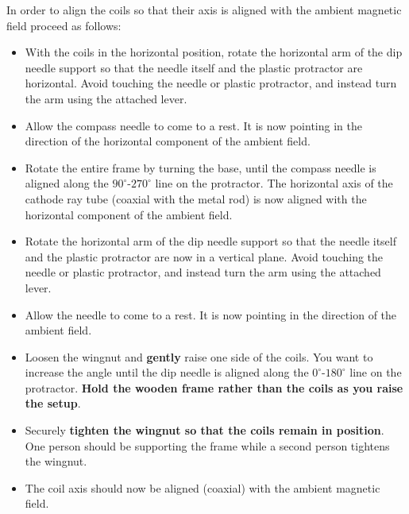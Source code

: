 In order to align the coils so that their axis is aligned with the ambient magnetic field proceed as follows:
\begin{itemize}
    \item With the coils in the horizontal position, rotate the horizontal arm of the dip needle support so that the needle itself and the plastic protractor are horizontal.  Avoid touching the needle or plastic protractor, and instead turn the arm using the attached lever.
    \item Allow the compass needle to come to a rest.  It is now pointing in the direction of the horizontal component of the ambient field.
    \item Rotate the entire frame by turning the base, until the compass needle is aligned along the $90^\circ$-$270^\circ$ line on the protractor.  The horizontal axis of the cathode ray tube (coaxial with the metal rod) is now aligned with the horizontal component of the ambient field.
    \item Rotate the horizontal arm of the dip needle support so that the needle itself and the plastic protractor are now in a vertical plane.  Avoid touching the needle or plastic protractor, and instead turn the arm using the attached lever.
    \item Allow the needle to come to a rest.  It is now pointing in the direction of the ambient field.
    \item Loosen the wingnut and \textbf{gently} raise one side of the coils.  You want to increase the angle until the dip needle is aligned along the $0^\circ$-$180^\circ$ line on the protractor.  \textbf{Hold the wooden frame rather than the coils as you raise the setup}.
    \item Securely \textbf{tighten the wingnut so that the coils remain in position}.  One person should be supporting the frame while a second person tightens the wingnut.
    \item The coil axis should now be aligned (coaxial) with the ambient magnetic field.
\end{itemize}

